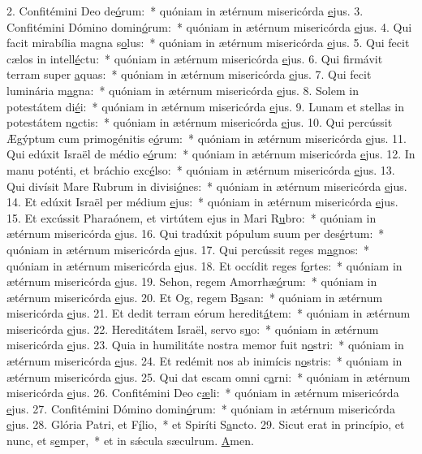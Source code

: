 2. Confitémini Deo de\uline{ó}rum:~* quóniam in ætérnum misericórda \uline{e}jus.
3. Confitémini Dómino domin\uline{ó}rum:~* quóniam in ætérnum misericórda \uline{e}jus.
4. Qui facit mirabília magna s\uline{o}lus:~* quóniam in ætérnum misericórda \uline{e}jus.
5. Qui fecit cælos in intell\uline{é}ctu:~* quóniam in ætérnum misericórda \uline{e}jus.
6. Qui firmávit terram super \uline{a}quas:~* quóniam in ætérnum misericórda \uline{e}jus.
7. Qui fecit luminária m\uline{a}gna:~* quóniam in ætérnum misericórda \uline{e}jus.
8. Solem in potestátem di\uline{é}i:~* quóniam in ætérnum misericórda \uline{e}jus.
9. Lunam et stellas in potestátem n\uline{o}ctis:~* quóniam in ætérnum misericórda \uline{e}jus.
10. Qui percússit Ægýptum cum primogénitis e\uline{ó}rum:~* quóniam in ætérnum misericórda \uline{e}jus.
11. Qui edúxit Israël de médio e\uline{ó}rum:~* quóniam in ætérnum misericórda \uline{e}jus.
12. In manu poténti, et bráchio exc\uline{é}lso:~* quóniam in ætérnum misericórda \uline{e}jus.
13. Qui divísit Mare Rubrum in divisi\uline{ó}nes:~* quóniam in ætérnum misericórda \uline{e}jus.
14. Et edúxit Israël per médium \uline{e}jus:~* quóniam in ætérnum misericórda \uline{e}jus.
15. Et excússit Pharaónem, et virtútem ejus in Mari R\uline{u}bro:~* quóniam in ætérnum misericórda \uline{e}jus.
16. Qui tradúxit pópulum suum per des\uline{é}rtum:~* quóniam in ætérnum misericórda \uline{e}jus.
17. Qui percússit reges m\uline{a}gnos:~* quóniam in ætérnum misericórda \uline{e}jus.
18. Et occídit reges f\uline{o}rtes:~* quóniam in ætérnum misericórda \uline{e}jus.
19. Sehon, regem Amorrhæ\uline{ó}rum:~* quóniam in ætérnum misericórda \uline{e}jus.
20. Et Og, regem B\uline{a}san:~* quóniam in ætérnum misericórda \uline{e}jus.
21. Et dedit terram eórum heredit\uline{á}tem:~* quóniam in ætérnum misericórda \uline{e}jus.
22. Hereditátem Israël, servo s\uline{u}o:~* quóniam in ætérnum misericórda \uline{e}jus.
23. Quia in humilitáte nostra memor fuit n\uline{o}stri:~* quóniam in ætérnum misericórda \uline{e}jus.
24. Et redémit nos ab inimícis n\uline{o}stris:~* quóniam in ætérnum misericórda \uline{e}jus.
25. Qui dat escam omni c\uline{a}rni:~* quóniam in ætérnum misericórda \uline{e}jus.
26. Confitémini Deo c\uline{æ}li:~* quóniam in ætérnum misericórda \uline{e}jus.
27. Confitémini Dómino domin\uline{ó}rum:~* quóniam in ætérnum misericórda \uline{e}jus.
28. Glória Patri, et F\uline{í}lio,~* et Spiríti S\uline{a}ncto.
29. Sicut erat in princípio, et nunc, et s\uline{e}mper,~* et in sǽcula sæculrum. \uline{A}men.
